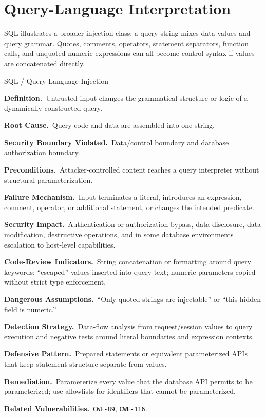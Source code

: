 \documentclass[11pt]{article}
\newcommand{\field}[1]{\par\smallskip\noindent\textbf{#1.}\ }
\newcommand{\cwe}[1]{\texttt{#1}}
\begin{document}
\section{Query-Language Interpretation}

SQL illustrates a broader injection class: a query string mixes data values and query grammar. Quotes, comments, operators, statement separators, function calls, and unquoted numeric expressions can all become control syntax if values are concatenated directly.

\begin{catalogbox}{SQL / Query-Language Injection}
\field{Definition}Untrusted input changes the grammatical structure or logic of a dynamically constructed query.

\field{Root Cause}Query code and data are assembled into one string.

\field{Security Boundary Violated}Data/control boundary and database authorization boundary.

\field{Preconditions}Attacker-controlled content reaches a query interpreter without structural parameterization.

\field{Failure Mechanism}Input terminates a literal, introduces an expression, comment, operator, or additional statement, or changes the intended predicate.

\field{Security Impact}Authentication or authorization bypass, data disclosure, data modification, destructive operations, and in some database environments escalation to host-level capabilities.

\field{Code-Review Indicators}String concatenation or formatting around query keywords; ``escaped'' values inserted into query text; numeric parameters copied without strict type enforcement.

\field{Dangerous Assumptions}``Only quoted strings are injectable'' or ``this hidden field is numeric.''

\field{Detection Strategy}Data-flow analysis from request/session values to query execution and negative tests around literal boundaries and expression contexts.

\field{Defensive Pattern}Prepared statements or equivalent parameterized APIs that keep statement structure separate from values.

\field{Remediation}Parameterize every value that the database API permits to be parameterized; use allowlists for identifiers that cannot be parameterized.

\field{Related Vulnerabilities}\cwe{CWE-89}, \cwe{CWE-116}.
\end{catalogbox}
\end{document}
